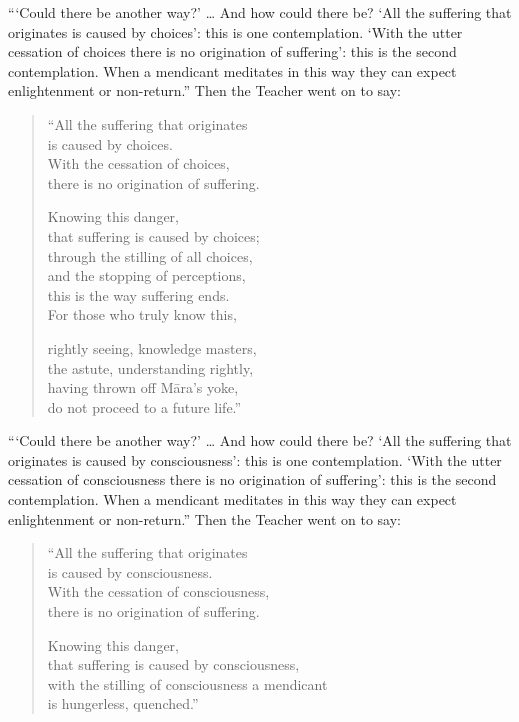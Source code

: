 \documentclass[12pt,openany]{book}%
\begin{document}
“‘Could there be another way?’ … And how could there be? ‘All the suffering that originates is caused by choices’: this is one contemplation. ‘With the utter cessation of choices there is no origination of suffering’: this is the second contemplation. When a mendicant meditates in this way they can expect enlightenment or non-return.” Then the Teacher went on to say: 

\begin{verse}%
“All the suffering that originates \\
is caused by choices. \\
With the cessation of choices, \\
there is no origination of suffering. 

Knowing this danger, \\
that suffering is caused by choices; \\
through the stilling of all choices, \\
and the stopping of perceptions, \\
this is the way suffering ends. \\
For those who truly know this, 

rightly seeing, knowledge masters, \\
the astute, understanding rightly, \\
having thrown off \textsanskrit{Māra}’s yoke, \\
do not proceed to a future life.” 

%
\end{verse}

“‘Could there be another way?’ … And how could there be? ‘All the suffering that originates is caused by consciousness’: this is one contemplation. ‘With the utter cessation of consciousness there is no origination of suffering’: this is the second contemplation. When a mendicant meditates in this way they can expect enlightenment or non-return.” Then the Teacher went on to say: 

\begin{verse}%
“All the suffering that originates \\
is caused by consciousness. \\
With the cessation of consciousness, \\
there is no origination of suffering. 

Knowing this danger, \\
that suffering is caused by consciousness, \\
with the stilling of consciousness a mendicant \\
is hungerless, quenched.” 

%
\end{verse}
\end{document}
